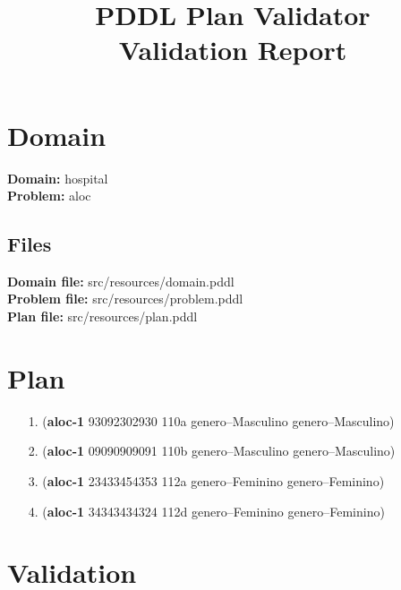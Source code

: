 \documentclass{article}
\title{\textbf{PDDL Plan Validator}\\Validation Report}
\date{} %
\begin{document}
\maketitle

\section{Domain}
\textbf{Domain:}  hospital\\
\textbf{Problem:} aloc

\subsection{Files}
\textbf{Domain file:}  src/resources/domain.pddl \\
\textbf{Problem file:} src/resources/problem.pddl\\
\textbf{Plan file:}    src/resources/plan.pddl

\section{Plan}

\begin{itemize}
    \item[1.] (\textbf{aloc-1} 93092302930 110a genero--Masculino genero--Masculino)
    \item[2.] (\textbf{aloc-1} 09090909091 110b genero--Masculino genero--Masculino)
    \item[3.] (\textbf{aloc-1} 23433454353 112a genero--Feminino genero--Feminino)
    \item[4.] (\textbf{aloc-1} 34343434324 112d genero--Feminino genero--Feminino)
\end{itemize}

\section{Validation}
\end{document}
